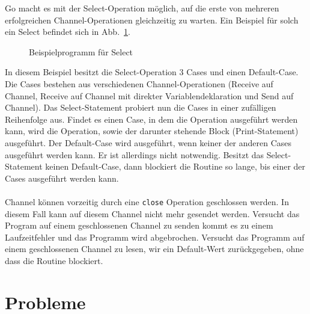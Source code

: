 Go macht es mit der Select-Operation möglich, auf die erste von mehreren 
erfolgreichen Channel-Operationen gleichzeitig zu warten. Ein Beispiel für solch 
ein Select befindet sich in Abb.~\ref{Chan:Analyze-Sec:Channel-Fig:SelectEx}.
\begin{figure}[h!]
  
  \caption{Beispielprogramm für Select}
  \label{Chan:Analyze-Sec:Channel-Fig:SelectEx}
\end{figure}
In diesem Beispiel besitzt die Select-Operation 3 Cases und einen Default-Case.
Die Cases bestehen aus verschiedenen Channel-Operationen (Receive auf Channel, 
Receive auf Channel mit direkter Variablendeklaration und Send auf Channel).
Das Select-Statement probiert nun die Cases in einer zufälligen Reihenfolge 
aus. Findet es einen Case, in dem die Operation ausgeführt werden kann, wird 
die Operation, sowie der darunter stehende Block (Print-Statement) ausgeführt.
Der Default-Case wird ausgeführt, wenn keiner der anderen Cases ausgeführt 
werden kann. Er ist allerdings nicht notwendig. Besitzt das Select-Statement 
keinen Default-Case, dann blockiert die Routine so lange, bis einer der Cases 
ausgeführt werden kann.\\\\
Channel können vorzeitig durch eine \texttt{close} Operation geschlossen werden.
In diesem Fall kann auf diesem Channel nicht mehr gesendet werden. Versucht 
das Program auf einem geschlossenen Channel zu senden kommt es zu einem 
Laufzeitfehler und das Programm wird abgebrochen. Versucht das Programm 
auf einem geschlossenen Channel zu lesen, wir ein Default-Wert zurückgegeben,
ohne dass die Routine blockiert.

\section{Probleme}\label{chap:background-sec:Prob}

